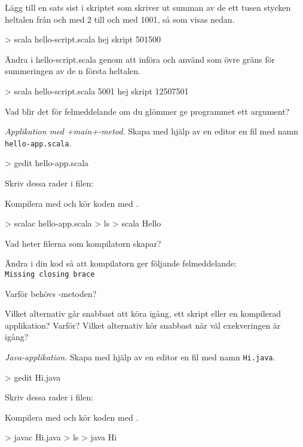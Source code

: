 \Subtask Lägg till en sats sist i skriptet som skriver ut summan av de ett tusen stycken heltalen från och med 2 till och med 1001, så som visas nedan.
\begin{REPL}
> scala hello-script.scala
hej skript
501500
\end{REPL}

\Subtask Ändra i hello-script.scala genom att införa  och använd  som övre gräns för summeringen av de n första heltalen.
\begin{REPL}
> scala hello-script.scala 5001
hej skript
12507501
\end{REPL}

\Subtask Vad blir det för felmeddelande om du glömmer ge programmet ett argument?


\Task \emph{Applikation med \code+main+-metod.} Skapa med hjälp av en editor en fil med namn \texttt{hello-app.scala}.
\begin{REPLnonum}
> gedit hello-app.scala
\end{REPLnonum}
Skriv dessa rader i filen:



\Subtask Kompilera med  och kör koden med .
\begin{REPLnonum}
> scalac hello-app.scala
> ls
> scala Hello
\end{REPLnonum}
Vad heter filerna som kompilatorn skapar?

\Subtask Ändra i din kod så att kompilatorn ger följande felmeddelande: \\
\texttt{Missing closing brace}

\Subtask\Pen Varför behövs -metoden?

\Subtask\Pen Vilket alternativ går snabbast att köra igång, ett skript eller en kompilerad applikation? Varför? Vilket alternativ kör snabbast när väl exekveringen är igång?


\Task \label{task:java} \emph{Java-applikation.} Skapa med hjälp av en editor en fil med namn \texttt{Hi.java}.
\begin{REPLnonum}
> gedit Hi.java
\end{REPLnonum}
Skriv dessa rader i filen:


\noindent Kompilera med  och kör koden med .
\begin{REPLnonum}
> javac Hi.java
> ls
> java Hi
\end{REPLnonum}

